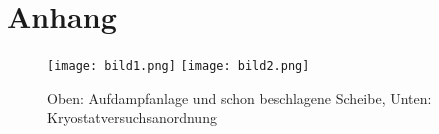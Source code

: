 \documentclass[twoside,        %
               BCOR12mm,       %
               english,ngerman, %
               fleqn,headsepline=false,footsepline=false
              ]{MFPREPORT}
\begin{document}
\section{Anhang}

\begin{figure}
\centering
\texttt{[image: bild1.png]}
\texttt{[image: bild2.png]}
\caption{
Oben: Aufdampfanlage und schon beschlagene Scheibe,
Unten: Kryostatversuchsanordnung
}
\label{fig:aufbau1}
\end{figure}

%
%
%
%



\end{document}
